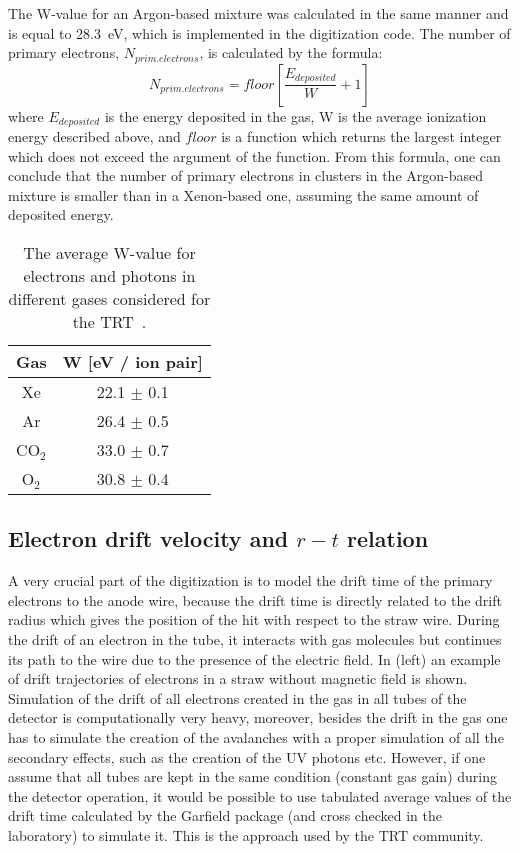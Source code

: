 The W-value for an Argon-based mixture was calculated in the same manner and is equal to 28.3~eV, which is implemented in the digitization code.
The number of primary electrons, $N_{prim.electrons}$, is calculated by the formula:
\begin{equation}
 N_{prim.electrons} = floor \left[\dfrac{E_{deposited}}{W} + 1\right]
\end{equation}
where $E_{deposited}$ is the energy deposited in the gas, W is the average ionization energy described above, and $floor$ is a function which returns
the largest integer which does not exceed the argument of the function.
From this formula, one can conclude that the number of primary electrons in clusters in the Argon-based mixture is smaller than in a Xenon-based one, 
assuming the same amount of deposited energy.

\begin{table}[p]
  \begin{tabular}{c|c}
    Gas & W [eV / ion pair]\\
    \hline
    Xe & 22.1 $\pm$ 0.1 \\
    Ar & 26.4 $\pm$ 0.5 \\
    CO$_2$ & 33.0 $\pm$ 0.7 \\
    O$_2$ & 30.8 $\pm$ 0.4 \\
  \end{tabular}
  \caption{The average W-value for electrons and photons in different gases considered for the TRT~\cite{cwetanski_thesis}.}
  \label{tab:ionization_energy}
\end{table}

\subsection{Electron drift velocity and $r-t$ relation}

A very crucial part of the digitization is to model the drift time of the primary electrons to the anode wire, because the drift time is directly related to the drift radius which gives the position of the hit with respect to the straw wire.
During the drift of an electron in the tube, it interacts with gas molecules but continues its path to the wire due to the presence of the electric field.
In  (left) an example of drift trajectories of electrons in a straw without magnetic field is shown.
Simulation of the drift of all electrons created in the gas in all tubes of the detector is computationally very heavy,
moreover, besides the drift in the gas one has to simulate the creation of the avalanches with a proper simulation of all the secondary effects,
such as the creation of the UV photons etc. However, if one assume that all tubes are kept in the same condition (constant gas gain) during the detector operation, it would
be possible to use tabulated average values of the drift time calculated by the Garfield package (and cross checked in the laboratory) to simulate it.
This is the approach used by the TRT community. 

